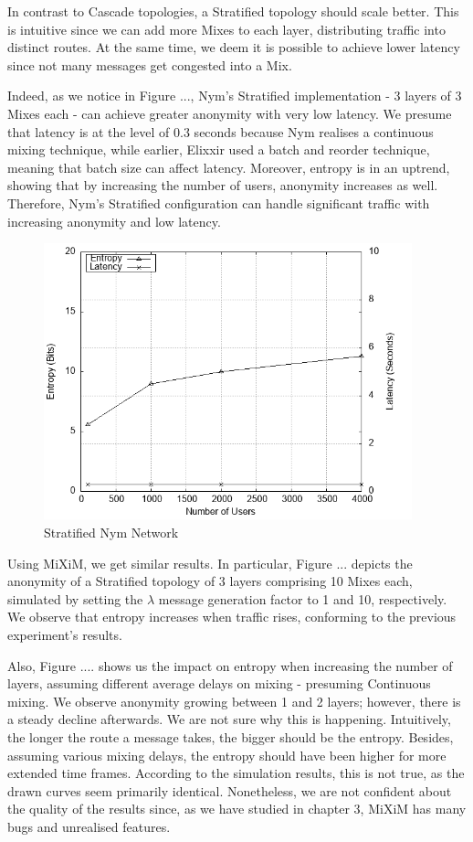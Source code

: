 \documentclass[logo,msc,cyber]{infthesis}   %
\begin{document}
 In contrast to Cascade topologies, a Stratified topology should scale better.
 This is intuitive since we can add more Mixes to each layer, distributing
 traffic into distinct routes. At the same time, we deem it is possible to
 achieve lower latency since not many messages get congested into a Mix. 

 Indeed, as we notice in Figure ..., Nym's Stratified implementation - 3 layers
 of 3 Mixes each - can achieve greater anonymity with very low latency. We
 presume that latency is at the level of 0.3 seconds because Nym realises a
 continuous mixing technique, while earlier, Elixxir used a batch and reorder
 technique, meaning that batch size can affect latency. Moreover, entropy is in
 an uptrend, showing that by increasing the number of users, anonymity increases
 as well. Therefore, Nym's Stratified configuration can handle significant
 traffic with increasing anonymity and low latency.

\begin{figure}[h!]
    \centering
    \includegraphics[height=8cm]{figures/simulator/2.png}
    \caption{Stratified Nym Network}
    \label{fig:nym-stratified}
 \end{figure}

 Using MiXiM, we get similar results. In particular, Figure ... depicts the
 anonymity of a Stratified topology of 3 layers comprising 10 Mixes each,
 simulated by setting the $\lambda$ message generation factor to 1 and 10,
 respectively. We observe that entropy increases when traffic rises, conforming
 to the previous experiment's results.

 Also, Figure .... shows us the impact on entropy when increasing the number of
 layers, assuming different average delays on mixing - presuming Continuous
 mixing. We observe anonymity growing between 1 and 2 layers; however, there is
 a steady decline afterwards. We are not sure why this is happening.
 Intuitively, the longer the route a message takes, the bigger should be the
 entropy. Besides, assuming various mixing delays, the entropy should have been
 higher for more extended time frames. According to the simulation results, this
 is not true, as the drawn curves seem primarily identical. Nonetheless, we are
 not confident about the quality of the results since, as we have studied in
 chapter 3, MiXiM has many bugs and unrealised features.
\end{document}
